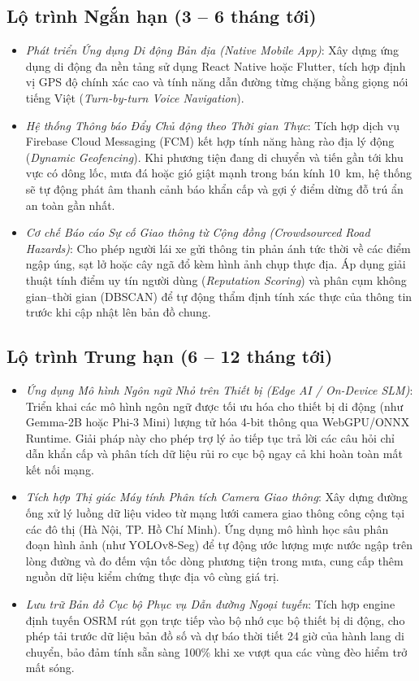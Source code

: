 \subsection{Lộ trình Ngắn hạn (3 -- 6 tháng tới)}
\begin{itemize}
    \item[-] \textit{Phát triển Ứng dụng Di động Bản địa (Native Mobile App)}: Xây dựng ứng dụng di động đa nền tảng sử dụng React Native hoặc Flutter, tích hợp định vị GPS độ chính xác cao và tính năng dẫn đường từng chặng bằng giọng nói tiếng Việt (\textit{Turn-by-turn Voice Navigation}).
    \item[-] \textit{Hệ thống Thông báo Đẩy Chủ động theo Thời gian Thực}: Tích hợp dịch vụ Firebase Cloud Messaging (FCM) kết hợp tính năng hàng rào địa lý động (\textit{Dynamic Geofencing}). Khi phương tiện đang di chuyển và tiến gần tới khu vực có dông lốc, mưa đá hoặc gió giật mạnh trong bán kính 10~km, hệ thống sẽ tự động phát âm thanh cảnh báo khẩn cấp và gợi ý điểm dừng đỗ trú ẩn an toàn gần nhất.
    \item[-] \textit{Cơ chế Báo cáo Sự cố Giao thông từ Cộng đồng (\textit{Crowdsourced Road Hazards})}: Cho phép người lái xe gửi thông tin phản ánh tức thời về các điểm ngập úng, sạt lở hoặc cây ngã đổ kèm hình ảnh chụp thực địa. Áp dụng giải thuật tính điểm uy tín người dùng (\textit{Reputation Scoring}) và phân cụm không gian--thời gian (DBSCAN) để tự động thẩm định tính xác thực của thông tin trước khi cập nhật lên bản đồ chung.
\end{itemize}

\subsection{Lộ trình Trung hạn (6 -- 12 tháng tới)}
\begin{itemize}
    \item[-] \textit{Ứng dụng Mô hình Ngôn ngữ Nhỏ trên Thiết bị (Edge AI / On-Device SLM)}: Triển khai các mô hình ngôn ngữ được tối ưu hóa cho thiết bị di động (như Gemma-2B hoặc Phi-3 Mini) lượng tử hóa 4-bit thông qua WebGPU/ONNX Runtime. Giải pháp này cho phép trợ lý ảo tiếp tục trả lời các câu hỏi chỉ dẫn khẩn cấp và phân tích dữ liệu rủi ro cục bộ ngay cả khi hoàn toàn mất kết nối mạng.
    \item[-] \textit{Tích hợp Thị giác Máy tính Phân tích Camera Giao thông}: Xây dựng đường ống xử lý luồng dữ liệu video từ mạng lưới camera giao thông công cộng tại các đô thị (Hà Nội, TP. Hồ Chí Minh). Ứng dụng mô hình học sâu phân đoạn hình ảnh (như YOLOv8-Seg) để tự động ước lượng mực nước ngập trên lòng đường và đo đếm vận tốc dòng phương tiện trong mưa, cung cấp thêm nguồn dữ liệu kiểm chứng thực địa vô cùng giá trị.
    \item[-] \textit{Lưu trữ Bản đồ Cục bộ Phục vụ Dẫn đường Ngoại tuyến}: Tích hợp engine định tuyến OSRM rút gọn trực tiếp vào bộ nhớ cục bộ thiết bị di động, cho phép tải trước dữ liệu bản đồ số và dự báo thời tiết 24 giờ của hành lang di chuyển, bảo đảm tính sẵn sàng 100\% khi xe vượt qua các vùng đèo hiểm trở mất sóng.
\end{itemize}

